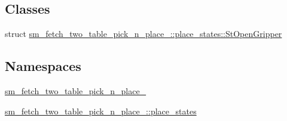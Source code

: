 \subsection*{Classes}
\begin{DoxyCompactItemize}
\item 
struct \hyperlink{structsm__fetch__two__table__pick__n__place__1_1_1place__states_1_1StOpenGripper}{sm\+\_\+fetch\+\_\+two\+\_\+table\+\_\+pick\+\_\+n\+\_\+place\+\_\+::place\+\_\+states\+::\+St\+Open\+Gripper}
\end{DoxyCompactItemize}
\subsection*{Namespaces}
\begin{DoxyCompactItemize}
\item 
 \hyperlink{namespacesm__fetch__two__table__pick__n__place__1}{sm\+\_\+fetch\+\_\+two\+\_\+table\+\_\+pick\+\_\+n\+\_\+place\+\_}
\item 
 \hyperlink{namespacesm__fetch__two__table__pick__n__place__1_1_1place__states}{sm\+\_\+fetch\+\_\+two\+\_\+table\+\_\+pick\+\_\+n\+\_\+place\+\_\+::place\+\_\+states}
\end{DoxyCompactItemize}
